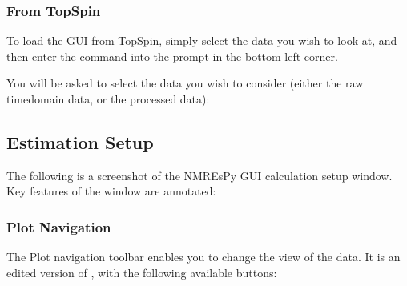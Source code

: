 \documentclass[letterpaper,10pt,english]{sphinxmanual}
\begin{document}
\subsubsection{From TopSpin}
\label{\detokenize{gui/usage/loading:from-topspin}}
\sphinxAtStartPar
To load the GUI from TopSpin, simply select the data you wish to look at,
and then enter the command  into the prompt in the bottom left
corner.

\sphinxAtStartPar
You will be asked to select the data you wish to consider (either the
raw time\sphinxhyphen{}domain data, or the processed data):





\subsection{Estimation Set\sphinxhyphen{}up}
\label{\detokenize{gui/usage/setup:estimation-set-up}}\label{\detokenize{gui/usage/setup::doc}}
\sphinxAtStartPar
The following is a screenshot of the NMR\sphinxhyphen{}EsPy GUI calculation set\sphinxhyphen{}up window.
Key features of the window are annotated:



\subsubsection{Plot Navigation}
\label{\detokenize{gui/usage/setup:plot-navigation}}
\sphinxAtStartPar
The Plot navigation toolbar enables you to change the view of the data.
It is an edited version of
,
with the following available buttons:
\end{document}
